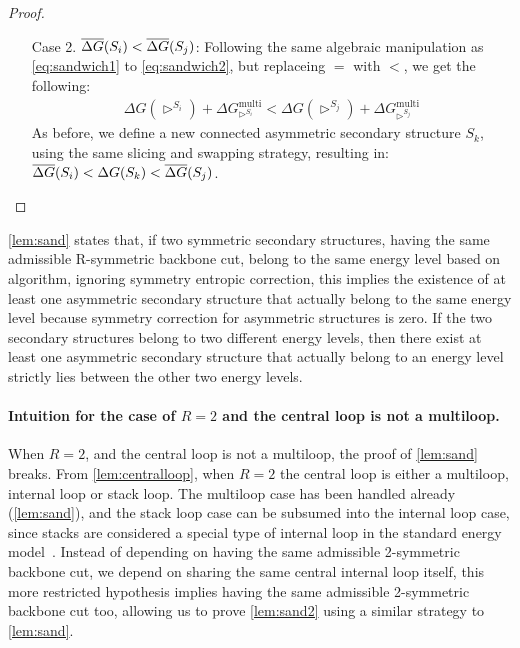 \begin{proof}
\begin{enumerate}
		\item[Case 2.]  $\overline{\Delta G}(S_i) < \overline{\Delta G}(S_j)$:  Following the same algebraic manipulation as \cref{eq:sandwich1} to \cref{eq:sandwich2}, but replaceing $=$ with $<$, we get the following:
		\begin{gather*}
			\Delta G(\rhd^{S_i}) + \Delta G_{\rhd^{S_i}}^\textrm{multi}  < \Delta G(\rhd^{S_j}) + \Delta G_{\rhd^{S_j}}^\textrm{multi}
		\end{gather*}
		As before, we define a new connected asymmetric secondary structure $S_k$, using the same slicing and swapping strategy, resulting in: $\overline{\Delta G}(S_i) < \Delta G(S_k) < \overline{\Delta G}(S_j)$. 
	\end{enumerate}
\end{proof}

\cref{lem:sand} states that, if two symmetric secondary structures, having the same admissible R-symmetric backbone cut, belong to the same energy level based on \symnMFE algorithm, ignoring symmetry entropic correction, this implies the existence of at least one asymmetric secondary structure that actually belong to the same energy level because symmetry  correction for asymmetric structures is zero. If the two secondary structures belong to two different energy levels, then there exist at least one asymmetric secondary structure that actually belong to an energy level strictly lies between the other two energy levels.


\paragraph{Intuition for the case of $R=2$ and the central loop is not a multiloop.} 
When $R=2$, and the central loop is not a multiloop, the proof of \cref{lem:sand} breaks.   
From \cref{lem:centralloop}, when $R=2$ the central loop is either a multiloop, internal loop or stack loop. 
The multiloop case has been handled already (\cref{lem:sand}), and the stack loop case can be subsumed into the  internal loop case, since stacks are considered a special type of internal loop in the standard energy model~\cite{dirks2007thermodynamic}. 
Instead of depending on having the same admissible 2-symmetric backbone cut, we depend on sharing the same central internal loop itself, this more restricted hypothesis   implies having the same admissible 2-symmetric backbone cut too, allowing us to prove \cref{lem:sand2} using a similar strategy to  \cref{lem:sand}.  


